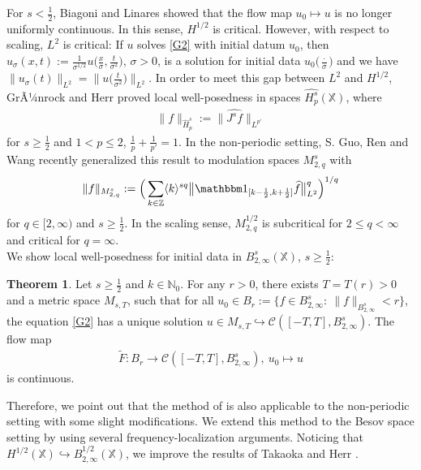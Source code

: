 \documentclass[reqno]{amsart}
\theoremstyle{Definitionl}
\theoremstyle{Definitionk}
\theoremstyle{definition}
\theoremstyle{Satzk}
\newtheorem{satzk}[defi]{Theorem}
\theoremstyle{Satzl}
\theoremstyle{Bemerkung}
\begin{document}
For $s<\tfrac12$, Biagoni and Linares \cite{BiLi} showed that the flow map $u_0\mapsto u$ is no longer uniformly continuous. In this sense, $H^{1/2}$ is critical. However, with respect to scaling, $L^2$ is critical: If $u$ solves \eqref{G2} with initial datum $u_0$, then $u_\sigma(x,t):=\tfrac{1}{\sigma^{1/2}}u\big(\tfrac{x}{\sigma},\tfrac{t}{\sigma^2}\big)$, $\sigma>0$, is a solution for initial data $u_0\big(\tfrac{\cdot}{\sigma}\big)$ and we have $\|u_\sigma(t)\|_{L^2}=\big\|u\big(\tfrac{t}{\sigma^2}\big)\big\|_{L^2}$. In order to meet this gap between $L^2$ and $H^{1/2}$, GrÃ¼nrock and Herr \cite{Grn2, GH} proved local well-posedness in spaces $\widehat{H^s_p}(\mathbb X)$, where 
\begin{align*}
\|f\|_{\widehat H^{s}_p}:=\big\|\widehat{J^{s}f}\big\|_{L^{p'}}
\end{align*}
for $s\ge\tfrac12$ and $1<p\le2$, $\tfrac1p+\tfrac1{p'}=1$. In the non-periodic setting, S. Guo, Ren and Wang \cite{SGuoDNLS} recently generalized this result to modulation spaces $M^s_{2,q}$ with
\begin{align*}
\|f\|_{M^s_{2,q}}:=\Big(\sum_{k\in\mathbb Z}\langle k\rangle^{sq}\big\|\mathbbm1_{[k-\frac12,k+\frac12]}\widehat f\big\|_{L^2}^q\Big)^{1/q}
\end{align*}
for $q\in[2,\infty)$ and $s\ge\tfrac12$. In the scaling sense, $M^{1/2}_{2,q}$ is subcritical for $2\le q<\infty$ and critical for $q=\infty$.\\[10pt]
We show local well-posedness for initial data in $B^s_{2,\infty}(\mathbb X)$, $s\ge\tfrac12$:
\begin{satzk}
\label{W}
Let $s\ge\tfrac12$ and $k\in\mathbb N_0$. For any $r>0$, there exists $T=T(r)>0$ and a metric space $M_{s,T}$, such that for all $u_0\in B_r:=\{f\in B_{2,\infty}^s:\ \|f\|_{B^s_{2,\infty}}<r\}$, the equation \eqref{G2} has a unique solution $u\in M_{s,T}\hookrightarrow \mathcal C([-T,T],B^s_{2,\infty})$. The flow map
\begin{align*}
\tilde F\colon B_r\to \mathcal C([-T,T],B^s_{2,\infty}),\ u_0\mapsto u
\end{align*}
is continuous.
\end{satzk}
Therefore, we point out that the method of \cite{Herr} is also applicable to the non-periodic setting with some slight modifications. We  extend this method to the Besov space setting by using several frequency-localization arguments. Noticing that $H^{1/2}(\mathbb X)\hookrightarrow B^{1/2}_{2,\infty}(\mathbb X)$, we improve the results of Takaoka \cite{Ta2} and Herr \cite{Herr}.\\[10pt]
\end{document}
